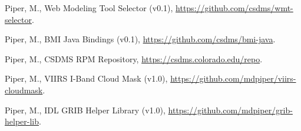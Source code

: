 \begin{enumerate}[{[}1{]}]
  \item Piper, M., Web Modeling Tool Selector (v0.1),
    \url{https://github.com/csdms/wmt-selector}.

  \item Piper, M., BMI Java Bindings (v0.1),
    \url{https://github.com/csdms/bmi-java}.

  \item Piper, M., CSDMS RPM Repository,
    \url{https://csdms.colorado.edu/repo}.

  \item Piper, M., VIIRS I-Band Cloud Mask (v1.0),
    \url{https://github.com/mdpiper/viirs-cloudmask}.

  \item Piper, M., IDL GRIB Helper Library (v1.0),
    \url{https://github.com/mdpiper/grib-helper-lib}.

\end{enumerate}
